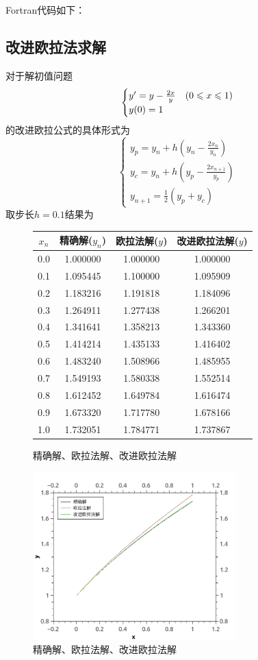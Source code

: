 Fortran代码如下：




\subsection{改进欧拉法求解}
对于解初值问题
$$\begin{cases}y\rq{}=y-\frac{2x}{y} &(0 \le x \le 1)\\ y(0)=1\end{cases}$$
的改进欧拉公式的具体形式为
$$\begin{cases}
y_p=y_n+h(y_n-\frac{2x_n}{y_n})\\
y_c=y_n+h(y_p-\frac{2x_{n+1}}{y_p})\\
y_{n+1}=\frac{1}{2}(y_p+y_c)
\end{cases}$$
取步长$h=0.1$结果为

\begin{figure}[htb]
\centering
\begin{tabular}{c|c|c|c}
$x_n$ &       精确解($y_n$)   & 欧拉法解($y$)  & 改进欧拉法解($y$)\\
\hline
 0.0  &      1.000000       &	1.000000	&1.000000\\
 0.1	&	1.095445 	&	1.100000	&1.095909\\
0.2	&	1.183216 	&	1.191818	&1.184096\\
0.3	&	1.264911 	&	1.277438	&1.266201\\
0.4	&	1.341641	&	1.358213	&1.343360\\
0.5	&	1.414214	&	1.435133	&1.416402\\
0.6	&	1.483240	&	1.508966	&1.485955\\
0.7	&	1.549193	&	1.580338	&1.552514\\
0.8	&	1.612452	&	1.649784	&1.616474\\
0.9	&	1.673320	&	1.717780	&1.678166\\
1.0	&	1.732051	&	1.784771	&1.737867
\end{tabular}
\caption{精确解、欧拉法解、改进欧拉法解}
\centering
\includegraphics[width=0.7\textwidth]{program/numerical_analysis_examples/improved_euler_method.jpeg}
\caption{精确解、欧拉法解、改进欧拉法解}
\label{fig:by:table}
\end{figure}

